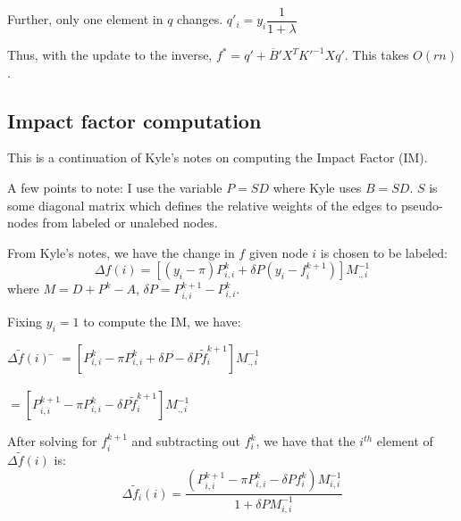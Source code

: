 \documentclass[12pt]{article}
\newcommand{\inv}[1]{#1^{-1}}
\begin{document}
			Further, only one element in $q$ changes. $q'_i = y_i \dfrac{1}{1+\lambda}$

			Thus, with the update to the inverse, $f^* = q' + \overline{B}'X^T\inv{K'}Xq'$.
			This takes $O(rn)$.

		\subsection{Impact factor computation}

			This is a continuation of Kyle's notes on computing the Impact Factor (IM).

			A few points to note: I use the variable $P = SD$ where Kyle uses $B = SD$. $S$ is some diagonal matrix which defines the relative weights of the edges to pseudo-nodes from labeled or unalebed nodes.

			From Kyle's notes, we have the change in $f$ given node $i$ is chosen to be labeled:
			\begin{equation}
				\Delta f(i) = [(y_i-\pi)P_{i,i}^k + \delta P(y_i-f_i^{k+1})] \inv{M}_{.,i}
			\end{equation}
			where $M = D + P^k - A$, $\delta P = P_{i,i}^{k+1}- P_{i,i}^{k}$.

			Fixing $y_i = 1$ to compute the IM, we have:
			\begin{tabbing}
				$\Delta \widetilde{f}(i) $ \= $= [P_{i,i}^k - \pi P_{i,i}^k + \delta P - \delta P\widetilde{f}_i^{k+1}]\inv{M}_{.,i}$\\\\
				\>$=[P_{i,i}^{k+1} - \pi P_{i,i}^k - \delta P\widetilde{f}_i^{k+1}]\inv{M}_{.,i}$
			\end{tabbing}
			After solving for $f_i^{k+1}$ and subtracting out $f_i^k$, we have that the $i^{th}$ element of $\Delta \widetilde{f}(i)$ is:
			\begin{equation}\label{eq:dfi_tilde}
				\Delta \widetilde{f}_i(i) = \dfrac{(P_{i,i}^{k+1} - \pi P_{i,i}^k - \delta P f_i^k)\inv{M}_{i,i}}{1 + \delta P\inv{M}_{i,i}}
			\end{equation}
\end{document}
